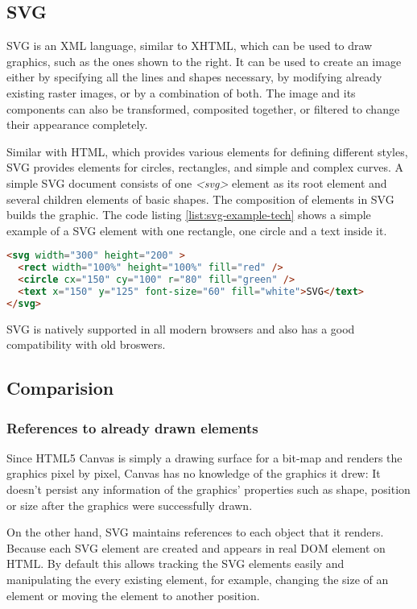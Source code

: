 \subsection{SVG}

SVG is an XML language, similar to XHTML, which can be used to draw graphics, such as the ones shown to the right. It can be used to create an image either by specifying all the lines and shapes necessary, by modifying already existing raster images, or by a combination of both. The image and its components can also be transformed, composited together, or filtered to change their appearance completely\cite{SVGintro}.

Similar with HTML, which provides various elements for defining different styles, SVG provides elements for circles, rectangles, and simple and complex curves. A simple SVG document consists of one \textit{<svg>} element as its root element and several children elements of basic shapes. The composition of elements in SVG builds the graphic. The code listing \ref{list:svg-example-tech} shows a simple example of a SVG element with one rectangle, one circle and a text inside it.

\begin{lstlisting}[language=HTML, caption=Simple Example of SVG elemnt, label={list:svg-example-tech}]
<svg width="300" height="200" >
  <rect width="100%" height="100%" fill="red" />
  <circle cx="150" cy="100" r="80" fill="green" />
  <text x="150" y="125" font-size="60" fill="white">SVG</text>
</svg>
\end{lstlisting}


SVG is natively supported in all modern browsers and also has a good compatibility with old broswers. 

\subsection{Comparision}

\subsubsection{References to already drawn elements}
Since HTML5 Canvas is simply a drawing surface for a bit-map and renders the graphics pixel by pixel, Canvas has no knowledge of the graphics it drew: It doesn’t persist any information of the graphics' properties such as shape, position or size after the graphics were successfully drawn.

On the other hand, SVG maintains references to each object that it renders. Because each SVG element are created and appears in real DOM element on HTML. By default this allows tracking the SVG elements easily and manipulating the every existing element, for example, changing the size of an element or moving the element to another position.

